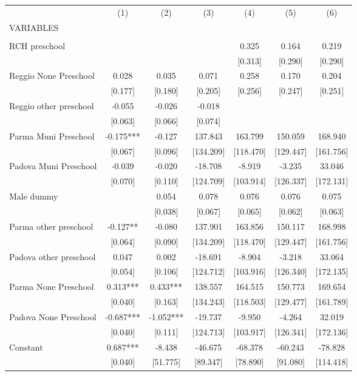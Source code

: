 \begin{tabular}{lcccccc} \hline
 & (1) & (2) & (3) & (4) & (5) & (6) \\
VARIABLES &  &  &  &  &  &  \\ \hline
 &  &  &  &  &  &  \\
RCH preschool &  &  &  & 0.325 & 0.164 & 0.219 \\
 &  &  &  & [0.313] & [0.290] & [0.290] \\
Reggio None Preschool & 0.028 & 0.035 & 0.071 & 0.258 & 0.170 & 0.204 \\
 & [0.177] & [0.180] & [0.205] & [0.256] & [0.247] & [0.251] \\
Reggio other preschool & -0.055 & -0.026 & -0.018 &  &  &  \\
 & [0.063] & [0.066] & [0.074] &  &  &  \\
Parma Muni Preschool & -0.175*** & -0.127 & 137.843 & 163.799 & 150.059 & 168.940 \\
 & [0.067] & [0.096] & [134.209] & [118.470] & [129.447] & [161.756] \\
Padova Muni Preschool & -0.039 & -0.020 & -18.708 & -8.919 & -3.235 & 33.046 \\
 & [0.070] & [0.110] & [124.709] & [103.914] & [126.337] & [172.131] \\
Male dummy &  & 0.054 & 0.078 & 0.076 & 0.076 & 0.075 \\
 &  & [0.038] & [0.067] & [0.065] & [0.062] & [0.063] \\
Parma other preschool & -0.127** & -0.080 & 137.901 & 163.856 & 150.117 & 168.998 \\
 & [0.064] & [0.090] & [134.209] & [118.470] & [129.447] & [161.756] \\
Padova other preschool & 0.047 & 0.002 & -18.691 & -8.904 & -3.218 & 33.064 \\
 & [0.054] & [0.106] & [124.712] & [103.916] & [126.340] & [172.135] \\
Parma None Preschool & 0.313*** & 0.433*** & 138.557 & 164.515 & 150.773 & 169.654 \\
 & [0.040] & [0.163] & [134.243] & [118.503] & [129.477] & [161.789] \\
Padova None Preschool & -0.687*** & -1.052*** & -19.737 & -9.950 & -4.264 & 32.019 \\
 & [0.040] & [0.111] & [124.713] & [103.917] & [126.341] & [172.136] \\
Constant & 0.687*** & -8.438 & -46.675 & -68.378 & -60.243 & -78.828 \\
 & [0.040] & [51.775] & [89.347] & [78.890] & [91.080] & [114.418] \\

\end{tabular}
